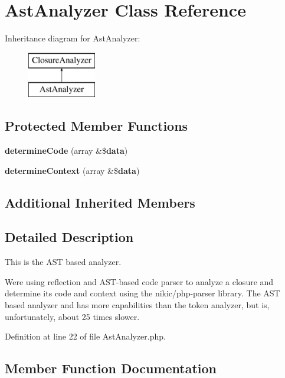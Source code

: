 \section{Ast\+Analyzer Class Reference}
\label{class_super_closure_1_1_analyzer_1_1_ast_analyzer}
Inheritance diagram for Ast\+Analyzer\+:\begin{figure}[H]
\begin{center}
\leavevmode
\includegraphics[height=2.000000cm]{class_super_closure_1_1_analyzer_1_1_ast_analyzer}
\end{center}
\end{figure}
\subsection*{Protected Member Functions}
\begin{DoxyCompactItemize}
\item 
{\bf determine\+Code} (array \&\${\bf data})
\item 
{\bf determine\+Context} (array \&\${\bf data})
\end{DoxyCompactItemize}
\subsection*{Additional Inherited Members}


\subsection{Detailed Description}
This is the A\+S\+T based analyzer.

We\textquotesingle{}re using reflection and A\+S\+T-\/based code parser to analyze a closure and determine its code and context using the nikic/php-\/parser library. The A\+S\+T based analyzer and has more capabilities than the token analyzer, but is, unfortunately, about 25 times slower. 

Definition at line 22 of file Ast\+Analyzer.\+php.



\subsection{Member Function Documentation}
